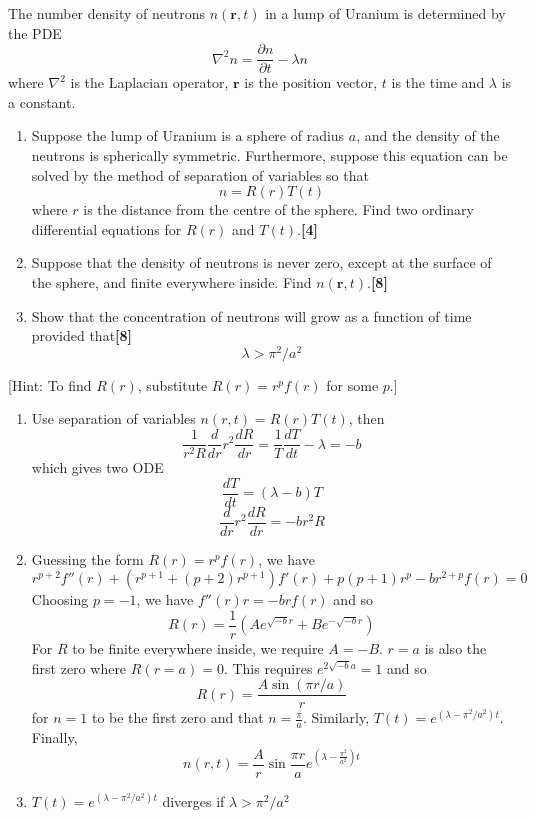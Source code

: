 \documentclass[a4paper]{article}
\begin{document}
\newpage
\begin{qns}
The number density of neutrons $n(\mathbf{r},t)$ in a lump of Uranium is determined by the PDE
$$\nabla^2n=\frac{\partial n}{\partial t}-\lambda n$$
where $\nabla^2$ is the Laplacian operator, $\mathbf{r}$ is the position vector, $t$ is the time and $\lambda$ is a constant.
\begin{enumerate}[label=(\alph*)]
\item Suppose the lump of Uranium is a sphere of radius $a$, and the density of the neutrons is spherically symmetric. Furthermore, suppose this equation can be solved by the method of separation of variables so that
$$n=R(r)T(t)$$
where $r$ is the distance from the centre of the sphere. Find two ordinary differential equations for $R(r)$ and $T(t)$.\hfill \textbf{[4]}
\item Suppose that the density of neutrons is never zero, except at the surface of the sphere, and finite everywhere inside. Find $n(\mathbf{r},t)$.\hfill \textbf{[8]}
\item Show that the concentration of neutrons will grow as a function of time provided that\hfill \textbf{[8]} $$\lambda>\pi^2/a^2$$
\end{enumerate}
[Hint: To find $R(r)$, substitute $R(r)=r^pf(r)$ for some $p$.]
\end{qns}
\begin{ans}\leavevmode
\begin{enumerate}[label=(\alph*)]
    \item Use separation of variables $n(r,t)=R(r)T(t)$, then
$$\frac{1}{r^2R}\frac{d}{dr}r^2\frac{dR}{dr}=\frac{1}{T}\frac{dT}{dt}-\lambda=-b$$
which gives two ODE
\begin{equation}
\frac{dT}{dt}=(\lambda-b)T\tag{time}
\end{equation} 
\begin{equation}
\frac{d}{dr}r^2\frac{dR}{dr}=-br^2R\tag{radial}
\end{equation}
\item Guessing the form $R(r)=r^pf(r)$, we have
$$r^{p+2}f''(r)+(r^{p+1}+(p+2)r^{p+1})f'(r)+p(p+1)r^p-br^{2+p}f(r)=0$$
Choosing $p=-1$, we have $f''(r)r=-brf(r)$ and so
$$R(r)=\frac{1}{r}(Ae^{\sqrt{-b}r}+Be^{-\sqrt{-b}r})$$
For $R$ to be finite everywhere inside, we require $A=-B$. $r=a$ is also the first zero where $R(r=a)=0$. This requires $e^{2\sqrt{-b}a}=1$ and so 
$$R(r)=\frac{A\sin(\pi r/a)}{r}$$
for $n=1$ to be the first zero and that $n=\frac{\pi}{a}$. Similarly, $T(t)=e^{(\lambda-\pi^2/a^2)t}$. Finally,
$$n(r,t)=\frac{A}{r}\sin\frac{\pi r}{a}e^{(\lambda-\frac{\pi^2}{a^2})t}$$
\item $T(t)=e^{(\lambda-\pi^2/a^2)t}$ diverges if $\lambda>\pi^2/a^2$
\end{enumerate}
\end{ans}
\end{document}
